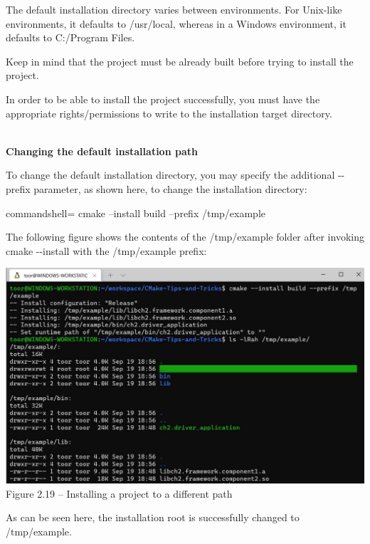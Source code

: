 The default installation directory varies between environments. For Unix-like environments, it defaults to /usr/local, whereas in a Windows environment, it defaults to C:/Program Files.

\begin{tcolorbox}[colback=webgreen!5!white,colframe=webgreen!75!black,title=Tip]
Keep in mind that the project must be already built before trying to install the project.

In order to be able to install the project successfully, you must have the appropriate rights/permissions to write to the installation target directory.
\end{tcolorbox}

\hspace*{\fill} \\ %
\noindent
\textbf{Changing the default installation path}

To change the default installation directory, you may specify the additional -{}-prefix parameter, as shown here, to change the installation directory:

\begin{tcblisting}{commandshell={}}
cmake --install build --prefix /tmp/example
\end{tcblisting}

The following figure shows the contents of the /tmp/example folder after invoking cmake -{}-install with the /tmp/example prefix:

\begin{center}
\includegraphics[width=1.\textwidth]{content/1/chapter2/images/19.jpg}\\
Figure 2.19 – Installing a project to a different path
\end{center}

As can be seen here, the installation root is successfully changed to /tmp/example.

